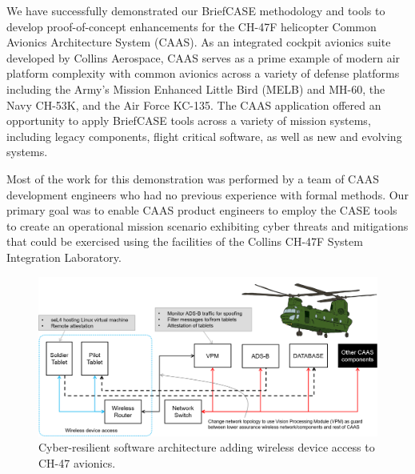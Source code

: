 We have successfully demonstrated our BriefCASE methodology and tools to
develop proof-of-concept enhancements for the CH-47F helicopter Common Avionics
Architecture System (CAAS). As an integrated cockpit avionics suite developed by Collins Aerospace, CAAS serves
as a prime example of modern air platform complexity with common avionics across a variety of
defense platforms including the Army's Mission Enhanced Little Bird (MELB)  and MH-60, the
Navy CH-53K, and the Air Force KC-135. The CAAS application offered an opportunity to
apply BriefCASE tools across a variety of mission systems, including legacy components, flight critical
software, as well as new and evolving systems. 

Most of the work for this demonstration was 
performed by a team of CAAS development engineers who had no
previous experience with formal methods.
Our primary goal was to enable CAAS product engineers to employ the CASE tools to create an
operational mission scenario exhibiting cyber threats and mitigations that could be exercised using
the facilities of the Collins CH-47F System Integration Laboratory. 

\begin{figure}
	\begin{center}
	\includegraphics[width=\textwidth]{./figs/caas-arch.png}
        \end{center}
	\caption{Cyber-resilient software architecture adding wireless device access to CH-47 avionics.} 
	\label{fig:caas-arch} 
\end{figure}

